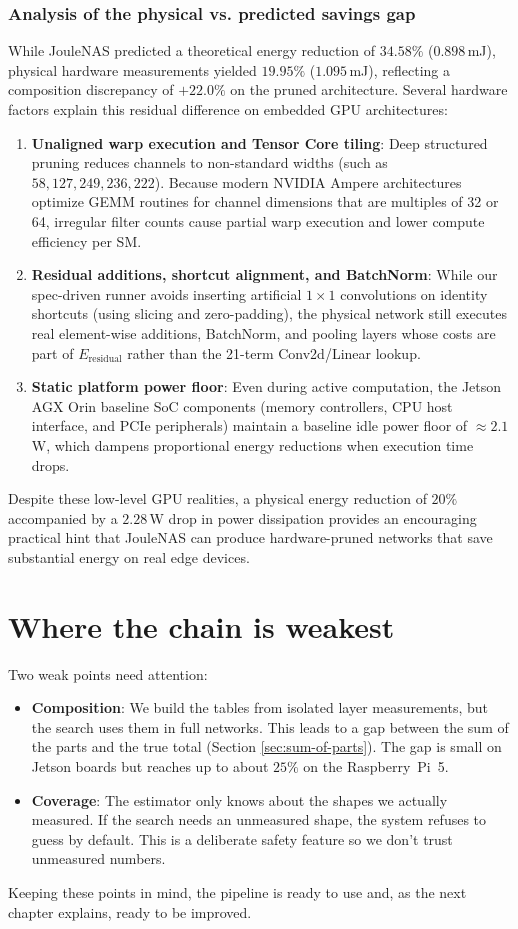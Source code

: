 \subsubsection{Analysis of the physical vs. predicted savings gap}
While JouleNAS predicted a theoretical energy reduction of $34.58\%$ ($0.898$\,mJ), physical hardware measurements yielded $19.95\%$ ($1.095$\,mJ), reflecting a composition discrepancy of $+22.0\%$ on the pruned architecture. Several hardware factors explain this residual difference on embedded GPU architectures:
\begin{enumerate}
    \item \textbf{Unaligned warp execution and Tensor Core tiling}: Deep structured pruning reduces channels to non-standard widths (such as $58, 127, 249, 236, 222$). Because modern NVIDIA Ampere architectures optimize GEMM routines for channel dimensions that are multiples of 32 or 64, irregular filter counts cause partial warp execution and lower compute efficiency per SM.
    \item \textbf{Residual additions, shortcut alignment, and BatchNorm}: While our spec-driven runner avoids inserting artificial $1 \times 1$ convolutions on identity shortcuts (using slicing and zero-padding), the physical network still executes real element-wise additions, BatchNorm, and pooling layers whose costs are part of $E_{\text{residual}}$ rather than the 21-term Conv2d/Linear lookup.
    \item \textbf{Static platform power floor}: Even during active computation, the Jetson AGX Orin baseline SoC components (memory controllers, CPU host interface, and PCIe peripherals) maintain a baseline idle power floor of $\approx 2.1$\,W, which dampens proportional energy reductions when execution time drops.
\end{enumerate}
Despite these low-level GPU realities, a physical energy reduction of $20\%$ accompanied by a $2.28$\,W drop in power dissipation provides an encouraging practical hint that JouleNAS can produce hardware-pruned networks that save substantial energy on real edge devices.

\section{Where the chain is weakest}

Two weak points need attention:

\begin{itemize}
    \item \textbf{Composition}: We build the tables from isolated layer measurements, but the search uses them in full networks. This leads to a gap between the sum of the parts and the true total (Section \ref{sec:sum-of-parts}). The gap is small on Jetson boards but reaches up to about $25\%$ on the Raspberry~Pi~5.
    \item \textbf{Coverage}: The estimator only knows about the shapes we actually measured. If the search needs an unmeasured shape, the system refuses to guess by default. This is a deliberate safety feature so we don't trust unmeasured numbers.
\end{itemize}

Keeping these points in mind, the pipeline is ready to use and, as the next chapter explains, ready to be improved.